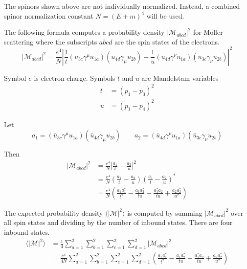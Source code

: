 \documentclass[12pt]{article}
\begin{document}
\noindent
The spinors shown above are not individually normalized.
Instead, a combined spinor normalization constant
$N=(E+m)^4$ will be used.

\bigskip
\noindent
The following formula computes a probability density $|\mathcal{M}_{abcd}|^2$
for Moller scattering where the subscripts $abcd$ are the spin states of the electrons.
\begin{equation*}
|\mathcal{M}_{abcd}|^2=\frac{e^4}{N}
\left|
\frac{1}{t}(\bar{u}_{3c}\gamma^\mu u_{1a})(\bar{u}_{4d}\gamma_\mu u_{2b})
-\frac{1}{u}(\bar{u}_{4d}\gamma^\nu u_{1a})(\bar{u}_{3c}\gamma_\nu u_{2b})
\right|^2
\end{equation*}

\noindent
Symbol $e$ is electron charge.
Symbols $t$ and $u$ are Mandelstam variables
\begin{align*}
t&=(p_1-p_3)^2
\\
u&=(p_1-p_4)^2
\end{align*}

\noindent
Let
\begin{equation*}
a_1=(\bar{u}_{3c}\gamma^\mu u_{1a})(\bar{u}_{4d}\gamma_\mu u_{2b})
\qquad
a_2=(\bar{u}_{4d}\gamma^\nu u_{1a})(\bar{u}_{3c}\gamma_\nu u_{2b})
\end{equation*}

\noindent
Then
\begin{align*}
|\mathcal{M}_{abcd}|^2
&=
\frac{e^4}{N}
\left|\frac{a_1}{t} - \frac{a_2}{u}\right|^2\\
&=
\frac{e^4}{N}
\left(\frac{a_1}{t} - \frac{a_2}{u}\right)\left(\frac{a_1}{t} - \frac{a_2}{u}\right)^*\\
&=
\frac{e^4}{N}
\left(
\frac{a_1a_1^*}{t^2} - \frac{a_1a_2^*}{tu} -
\frac{a_1^*a_2}{tu} + \frac{a_2a_2^*}{u^2}
\right)
\end{align*}

\noindent
The expected probability density $\langle|\mathcal{M}|^2\rangle$ is computed by
summing $|\mathcal{M}_{abcd}|^2$ over all spin states and dividing by the number
of inbound states.
There are four inbound states.
\begin{align*}
\langle|\mathcal{M}|^2\rangle
&=
\frac{1}{4}\sum_{a=1}^2\sum_{b=1}^2\sum_{c=1}^2\sum_{d=1}^2
|\mathcal{M}_{abcd}|^2\\
&=
\frac{e^4}{4N}\sum_{a=1}^2\sum_{b=1}^2\sum_{c=1}^2\sum_{d=1}^2
\left(
\frac{a_1a_1^*}{t^2}-\frac{a_1a_2^*}{tu}-\frac{a_1^*a_2}{tu}+\frac{a_2a_2^*}{u^2}
\right)
\end{align*}
\end{document}
